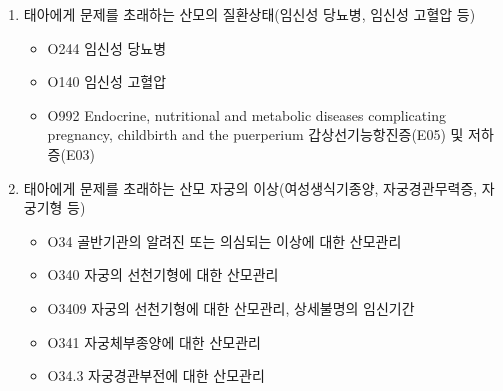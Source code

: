\begin{enumerate}[가)]\tightlist
\item 태아에게 문제를 초래하는 산모의 질환상태(임신성 당뇨병, 임신성 고혈압 등)
	\begin{itemize}\tightlist
	\item O244 임신성 당뇨병 
	\item O140 임신성 고혈압 
	\item O992 Endocrine, nutritional and metabolic diseases complicating pregnancy, childbirth and the puerperium 갑상선기능항진증(E05) 및 저하증(E03)
	\end{itemize}
\item 태아에게 문제를 초래하는 산모 자궁의 이상(여성생식기종양, 자궁경관무력증, 자궁기형 등) 
	\begin{itemize}\tightlist
	\item O34 골반기관의 알려진 또는 의심되는 이상에 대한 산모관리	 
	\item O340	자궁의 선천기형에 대한 산모관리	 
	\item O3409	자궁의 선천기형에 대한 산모관리, 상세불명의 임신기간	 
	\item O341	자궁체부종양에 대한 산모관리
	\item O34.3	자궁경관부전에 대한 산모관리	 

\end{itemize}
\end{enumerate}

